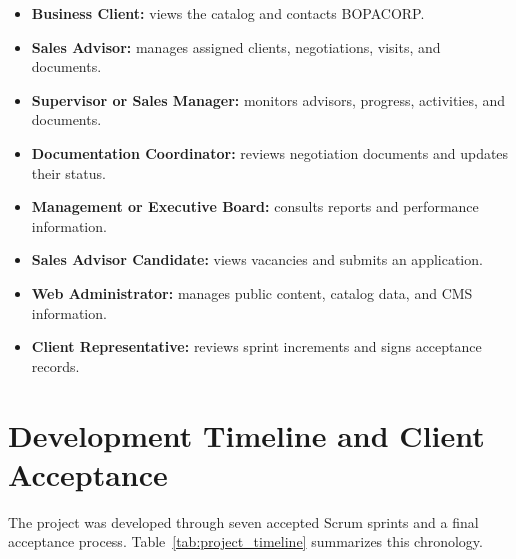 \documentclass[letterpaper%
, oneside%
, 12pt%
, memoireprojet%
, english%
,creativecommons,hyperref, withAlgo2e %
]{thETS}
\begin{document}
\begin{itemize}
    \item \textbf{Business Client:} views the catalog and contacts BOPACORP.
    \item \textbf{Sales Advisor:} manages assigned clients, negotiations, visits, and documents.
    \item \textbf{Supervisor or Sales Manager:} monitors advisors, progress, activities, and documents.
    \item \textbf{Documentation Coordinator:} reviews negotiation documents and updates their status.
    \item \textbf{Management or Executive Board:} consults reports and performance information.
    \item \textbf{Sales Advisor Candidate:} views vacancies and submits an application.
    \item \textbf{Web Administrator:} manages public content, catalog data, and CMS information.
    \item \textbf{Client Representative:} reviews sprint increments and signs acceptance records.
\end{itemize}

\section{Development Timeline and Client Acceptance}
The project was developed through seven accepted Scrum sprints and a final acceptance process. Table~\ref{tab:project_timeline} summarizes this chronology.
\end{document}
